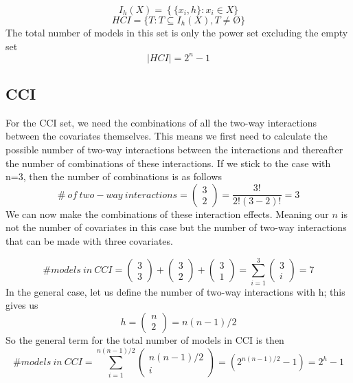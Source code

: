 \[I_h(X)=\left.\left\{\{x_i,h\}\right.:x_i\in X\right.\}\] 
\[HCI=\left.\{T:T\subseteq I_h\left(X\right),T\neq \textrm{\O}\right.\}\] 
The total number of models in this set is only the power set excluding the empty set
\[\left|HCI\right|\boldsymbol{=}2^n-1\] 

\subsection{CCI}

For the CCI set, we need the combinations of all the two-way interactions between the covariates themselves. This means we first need to calculate the possible number of two-way interactions between the interactions and thereafter the number of combinations of these interactions. If we stick to the case with n=3, then the number of combinations is as follows
\[\#\ of\ two-way\ interactions=\left( \begin{array}{c}
3 \\ 
2 \end{array}
\right)=\frac{3!}{2!\left(3-2\right)!}=3\] 
We can now make the combinations of these interaction effects. Meaning our $n$ is not the number of covariates in this case but the number of two-way interactions that can be made with three covariates.  

\noindent 
\[\#models\ in\ CCI=\left( \begin{array}{c}
3 \\ 
3 \end{array}
\right)+\left( \begin{array}{c}
3 \\ 
2 \end{array}
\right)+\left( \begin{array}{c}
3 \\ 
1 \end{array}
\right)=\sum^3_{i=1}{\left( \begin{array}{c}
3 \\ 
i \end{array}
\right)}=7\] 
In the general case, let us define the number of two-way interactions with h; this gives us
\[h=\left( \begin{array}{c}
n \\ 
2 \end{array}
\right)=n(n-1)/2\] 
So the general term for the total number of models in CCI is then
\[\#models\ in\ CCI=\sum^{n(n-1)/2}_{i=1}{\left( \begin{array}{c}
n(n-1)/2 \\ 
i \end{array}
\right)}=(2^{n(n-1)/2}-1)=2^h-1\] 


